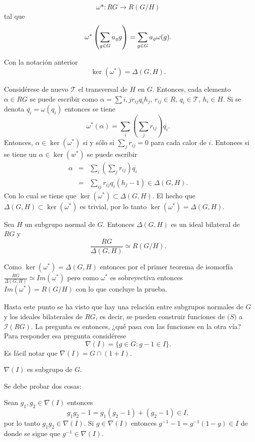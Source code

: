 \[\omega* : RG \to R(G/H)\]
tal que 
\[\omega^*\left(\sum_{g \in G} a_{g} g \right) = \sum_{g \in G} a_g\omega(g).\]
\begin{proposicion}
Con la notación anterior
\[\ker(\omega^*) =\Delta(G,H).\]
\end{proposicion}
\begin{proof*}
Considérese de nuevo $\mathcal{T}$ el transversal de $H$ en $G$. Entonces, cada elemento $\alpha \in RG$ se puede escribir como $ \alpha = \sum{i,j} r_{ij} q_ih_j$, $r_{ij} \in R$, $q_i \in \mathcal{T}$, $h_i \in H$. Si se denota $\overline{q_i} = \omega(q_i)$ entonces se tiene
\[\omega^*(\alpha) = \sum_i\left(\sum_jr_{ij}\right)\overline{q_i}. \]
Entonces, $\alpha \in \ker(\omega^*)$ si y sólo si $ \sum_jr_{ij} = 0 $ para cada calor de $i$. Entonces si se tiene un $\alpha \in \ker(w^*)$ se puede escribir
\begin{eqnarray*}
\alpha &=& \sum_i\left(\sum_jr_{ij}\right)\overline{q_i} \\
 &=& \sum_{ij}r_{ij}q_i(h_j-1) \in \Delta(G,H).  
\end{eqnarray*}
Con lo cual se tiene que $\ker(\omega^*) \subset \Delta(G,H)$. El hecho que $\Delta(G,H) \subset \ker(\omega^*)$ es trivial, por lo tanto $\ker(\omega^*) = \Delta(G,H)$.
\end{proof*}
\begin{corolario}
Sea $H$ un subgrupo normal de $G$. Entonces $\Delta(G,H)$ es un ideal bilateral de $RG$ y
\[\frac{RG}{\Delta(G,H)} \simeq R(G/H).\]
\end{corolario}
\begin{proof*}
Como $\ker(\omega^*) = \Delta(G,H)$ entonces por el primer teorema de isomorfía $ \frac{RG}{\Delta(G,H)} \simeq Im(\omega^*) $ pero como $\omega^*$ es sobreyectiva entonces $Im(\omega^*) = R(G/H)$ con lo que concluye la prueba. 
\end{proof*}
Hasta este punto se ha visto que hay una relación entre subgrupos normales de $G$ y los ideales bilaterales de $RG$, es decir, se pueden construir funciones de $\mathcal(S) $ a $\mathcal{I}(RG)$. La pregunta es entonces, ¿qué pasa con las funciones en la otra vía? Para responder esa pregunta considérese 
\[\nabla(I) = \{ g \in G \colon  g-1 \in I\}.\]
Es fácil notar que $\nabla(I) = G \cap (1+I)$.
\begin{lema}
$\nabla(I)$ es subgrupo de $G$.
\end{lema}
\begin{proof*}
Se debe probar dos cosas:
\begin{bulletList}
\newItem Sean $g_1,g_2 \in \nabla(I)$ entonces 
\[g_1g_2 -1 = g_1(g_2-1) + (g_2-1) \in I, \]
por lo tanto $g_1g_2 \in \nabla(I)$.
\newItem Si $g \in \nabla(I)$ entonces $g^{-1} -1 = g^{-1}(1-g) \in I$ de donde se sigue que $g^{-1} \in \nabla(I)$.\qedhere 
\end{bulletList}
\end{proof*}
